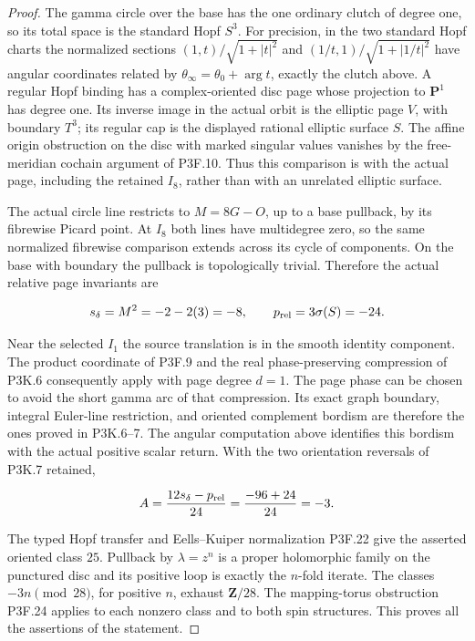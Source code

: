 \begin{proof}
The gamma circle over the base has the one ordinary clutch of
degree one, so its total space is the standard Hopf \(S^3\).
For precision, in the two standard Hopf charts the normalized
sections \((1,t)/\sqrt{1+|t|^2}\) and
\((1/t,1)/\sqrt{1+|1/t|^2}\) have angular coordinates related
by \(\theta_\infty=\theta_0+\arg t\), exactly the clutch
above.  A regular Hopf binding has a complex-oriented disc page
whose projection to \(\mathbf P^1\) has degree one.  Its inverse
image in the actual orbit is the elliptic page \(V\), with
boundary \(T^3\); its regular cap is the displayed rational
elliptic surface \(S\).  The affine origin obstruction on the
disc with marked singular values vanishes by the free-meridian
cochain argument of P3F.10.  Thus this comparison is with the
actual page, including the retained \(I_8\), rather than with
an unrelated elliptic surface.

The actual circle line restricts to \(M=8G-O\), up to a base
pullback, by its fibrewise Picard point.  At \(I_8\) both lines
have multidegree zero, so the same normalized fibrewise comparison
extends across its cycle of components.  On the base with boundary
the pullback is topologically trivial.  Therefore the actual
relative page invariants are

\[
 s_\delta=M^2=-2-2(3)=-8,
 \qquad p_{\rm rel}=3\sigma(S)=-24.
\]

Near the selected \(I_1\) the source translation is in the smooth
identity component.  The product coordinate of P3F.9 and the real
phase-preserving compression of P3K.6 consequently apply with
page degree \(d=1\).  The page phase can be chosen to avoid the
short gamma arc of that compression.  Its exact graph boundary,
integral Euler-line restriction, and oriented complement bordism
are therefore the ones proved in P3K.6–7.  The angular computation
above identifies this bordism with the actual positive scalar
return.  With the two orientation reversals of P3K.7 retained,

\[
 A=\frac{12s_\delta-p_{\rm rel}}{24}
   =\frac{-96+24}{24}=-3.
\]

The typed Hopf transfer and Eells--Kuiper normalization P3F.22 give
the asserted oriented class \(25\).  Pullback by
\(\lambda=z^n\) is a proper holomorphic family on the punctured
disc and its positive loop is exactly the \(n\)-fold iterate.
The classes \(-3n\pmod{28}\), for positive \(n\), exhaust
\(\mathbf Z/28\).  The mapping-torus obstruction P3F.24 applies
to each nonzero class and to both spin structures.  This proves
all the assertions of the statement.
\end{proof}

